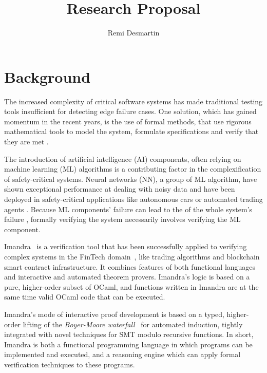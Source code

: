 \documentclass[]{article}
\title{Research Proposal}
\author{Remi Desmartin}
\begin{document}
\maketitle

\iffalse
\begin{abstract}

\end{abstract}
\fi

\section{Background}
The increased complexity of critical software systems has made traditional testing tools insufficient for detecting edge failure cases. One solution, which has gained momentum in the recent years, is the use of formal methods, that use rigorous mathematical tools to model the system, formulate specifications and verify that they are met \cite{newcombe_how_2015}. 

The introduction of artificial intelligence (AI) components, often relying on machine learning (ML) algorithms is a contributing factor in the complexification of safety-critical systems. Neural networks (NN), a group of ML algorithm, have shown exceptional performance at dealing with noisy data and have been deployed in safety-critical applications like autonomous cars \cite{} or automated trading agents \cite{bao_deep_2017}. Because ML components' failure can lead to the of the whole system's failure \cite{dreossi_compositional_2017}, formally verifying the system necessarily involves verifying the ML component.

Imandra~\cite{passmore_imandra_2020} is a verification tool that has been successfully applied to verifying complex systems in the FinTech
domain~\cite{passmore_lessons_2021}, like trading algorithms and blockchain smart contract infrastructure. It combines features of both functional languages and interactive and automated theorem provers. Imandra's logic is based on a pure, higher-order subset of OCaml, and
functions written in Imandra are at the same time valid OCaml code that can be
executed. 

Imandra's mode of interactive proof
development is based on a typed, higher-order lifting of the \emph{Boyer-Moore
	waterfall}~\cite{boyer_computational_1979} for automated induction, tightly integrated with novel
techniques for SMT modulo recursive functions. 
In short, Imandra is both a functional programming language in which programs can be implemented and executed, and a reasoning engine which can apply formal verification techniques to these programs.
\end{document}

